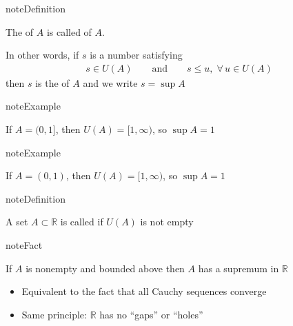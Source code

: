 \documentclass[letterpaper,10pt,english]{jupyterBook}
\begin{document}
\begin{sphinxadmonition}{note}{Definition}

\sphinxAtStartPar
The  of \(A\) is called  of \(A\).
\end{sphinxadmonition}

\sphinxAtStartPar
In other words, if \(s\) is a number satisfying
\begin{equation*}
\begin{split}
%
s \in U(A)
\qquad \text{and} \qquad
s \leq u, \; \forall \, u \in U(A)
%
\end{split}
\end{equation*}
\sphinxAtStartPar
then \(s\) is the  of \(A\) and we write \(s = \sup A\)

\begin{figure}[htbp]
\centering

\noindent{}
\end{figure}

\begin{sphinxadmonition}{note}{Example}

\sphinxAtStartPar
If \(A = (0, 1]\), then \(U(A) = [1, \infty)\), so \(\sup A = 1\)
\end{sphinxadmonition}

\begin{sphinxadmonition}{note}{Example}

\sphinxAtStartPar
If \(A = (0, 1)\), then \(U(A) = [1, \infty)\), so \(\sup A = 1\)
\end{sphinxadmonition}

\begin{sphinxadmonition}{note}{Definition}

\sphinxAtStartPar
A set \(A \subset \mathbb{R}\) is called  if \(U(A)\) is not empty
\end{sphinxadmonition}

\begin{sphinxadmonition}{note}{Fact}

\sphinxAtStartPar
If \(A\) is nonempty and bounded above then \(A\) has a supremum in \(\mathbb{R}\)
\end{sphinxadmonition}
\begin{itemize}
\item {} 
\sphinxAtStartPar
Equivalent to the fact that all Cauchy sequences converge

\item {} 
\sphinxAtStartPar
Same principle: \(\mathbb{R}\) has no “gaps” or “holes”

\end{itemize}
\end{document}
